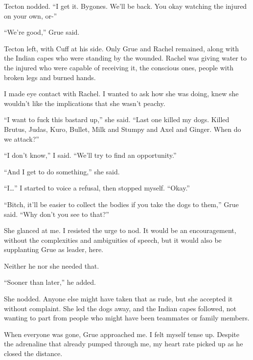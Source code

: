 Tecton nodded.  ``I get it.  Bygones.  We'll be back.  You okay watching the injured on your own, or-''



``We're good,'' Grue said.



Tecton left, with Cuff at his side.  Only Grue and Rachel remained, along with the Indian capes who were standing by the wounded.  Rachel was giving water to the injured who were capable of receiving it, the conscious ones, people with broken legs and burned hands.



I made eye contact with Rachel.  I wanted to ask how she was doing, knew she wouldn't like the implications that she wasn't peachy.



``I want to fuck this bastard up,'' she said.  ``Last one killed my dogs.  Killed Brutus, Judas, Kuro, Bullet, Milk and Stumpy and Axel and Ginger.  When do we attack?''



``I don't know,'' I said.  ``We'll try to find an opportunity.''



``And I get to do something,'' she said.



``I\ldots'' I started to voice a refusal, then stopped myself.  ``Okay.''



``Bitch, it'll be easier to collect the bodies if you take the dogs to them,'' Grue said.  ``Why don't you see to that?''



She glanced at me.  I resisted the urge to nod.  It would be an encouragement, without the complexities and ambiguities of speech, but it would also be supplanting Grue as leader, here.



Neither he nor she needed that.



``Sooner than later,'' he added.



She nodded.  Anyone else might have taken that as rude, but she accepted it without complaint.  She led the dogs away, and the Indian capes followed, not wanting to part from people who might have been teammates or family members.



When everyone was gone, Grue approached me.  I felt myself tense up.  Despite the adrenaline that already pumped through me, my heart rate picked up as he closed the distance.



